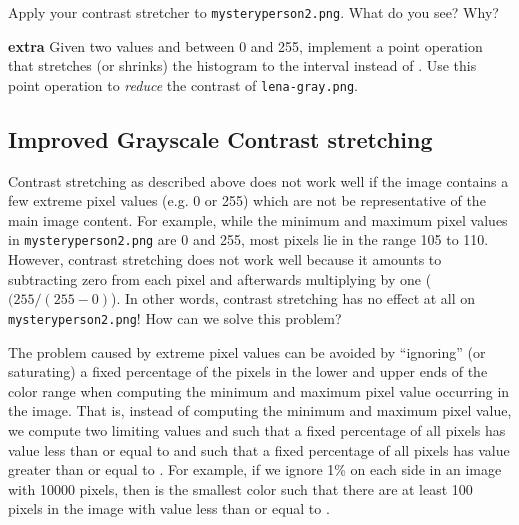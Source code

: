 \documentclass{book}
\begin{document}
\begin{exercise}
Apply your contrast stretcher to \texttt{mysteryperson2.png}. What do you see? Why?
\end{exercise}

\begin{exercise}
\textbf{extra} Given two values  and  between 0 and 255, implement a point operation that stretches (or shrinks) the histogram to the interval  instead of . Use this point operation to \emph{reduce} the contrast of \texttt{lena-gray.png}.
\end{exercise}

\subsection*{Improved Grayscale Contrast stretching}
Contrast stretching as described above does not work well if the image contains a few extreme pixel values (e.g. 0 or 255) which are not be representative of the main image content. For example, while the minimum and maximum pixel values in \texttt{mysteryperson2.png} are 0 and 255, most pixels lie in the range 105 to 110. However, contrast stretching does not work well because it amounts to subtracting zero from each pixel and afterwards multiplying by one ($(255 / (255 - 0)$). In other words, contrast stretching has no effect at all on \texttt{mysteryperson2.png}! How can we solve this problem?

The problem caused by extreme pixel values can be avoided by ``ignoring'' (or saturating) a fixed percentage of the pixels in the lower and upper ends of the color range when computing the minimum and maximum pixel value occurring in the image. That is, instead of computing the minimum and maximum pixel value, we compute two limiting values  and  such that a fixed percentage of all pixels has value less than or equal to  and such that a fixed percentage of all pixels has value greater than or equal to .  For example, if we ignore 1\% on each side in an image with 10000 pixels, then  is the smallest color such that there are at least 100 pixels in the image with value less than or equal to . 
\end{document}
